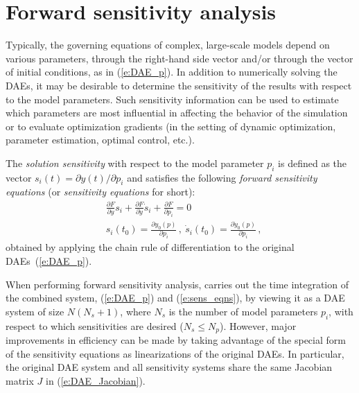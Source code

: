 \section{Forward sensitivity analysis}\label{ss:fwd_sensi}

Typically, the governing equations of complex, large-scale models
depend on various parameters,  through the right-hand side vector 
and/or through the vector of initial conditions, as in (\ref{e:DAE_p}).
In addition to numerically solving the DAEs, it may be desirable to
determine the sensitivity of the results with respect to the model
parameters. 
Such sensitivity information can be used to estimate which
parameters are most influential in affecting the behavior of the
simulation or to evaluate optimization gradients (in the setting of dynamic
optimization, parameter estimation, optimal control, etc.).

The {\em solution sensitivity} with respect to the model parameter
$p_i$ is defined as the vector 
$s_i (t) = {\partial y(t)}/{\partial p_i}$
and satisfies the following {\em forward sensitivity equations}
(or {\em sensitivity equations} for short):
\begin{equation}\label{e:sens_eqns}
\begin{split}
& \frac{\partial F}{\partial y} s_i + \frac{\partial F}{\partial \dot y} {\dot s_i} + \frac{\partial F}{\partial p_i} = 0\\
& s_i(t_0) = \frac{\partial y_{0}(p)}{\partial p_i} \, ,~ \dot s_i(t_0) =  \frac{\partial \dot y_{0}(p)}{\partial p_i} \, ,
\end{split}
\end{equation}
obtained by applying the chain rule of differentiation to the original DAEs~(\ref{e:DAE_p}). 


When performing forward sensitivity analysis, {\idas} carries out
the time integration of the combined system, (\ref{e:DAE_p}) and
(\ref{e:sens_eqns}), by viewing it as a DAE system of size
$N(N_s+1)$, where $N_s$ is the number of model parameters $p_i$, with
respect to which sensitivities are desired ($N_s \le N_p$).
However, major improvements in efficiency can be made by taking
advantage of the special form of the sensitivity equations as
linearizations of the original DAEs.  In particular, the original
DAE system and all sensitivity systems share the same Jacobian matrix
$J$ in (\ref{e:DAE_Jacobian}).


